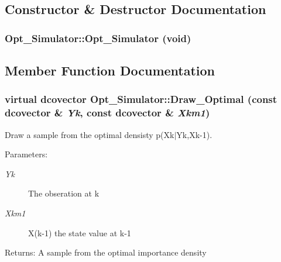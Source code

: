 \subsection{Constructor \& Destructor Documentation}
\hypertarget{class_opt___simulator_9c18baf105bd365af92a933e1a068c3e}{
\subsubsection[{Opt\_\-Simulator}]{\setlength{\rightskip}{0pt plus 5cm}Opt\_\-Simulator::Opt\_\-Simulator (void)}}
\label{class_opt___simulator_9c18baf105bd365af92a933e1a068c3e}




\subsection{Member Function Documentation}
\hypertarget{class_opt___simulator_75490247df4dfa14eb7b2d8d394675dd}{
\subsubsection[{Draw\_\-Optimal}]{\setlength{\rightskip}{0pt plus 5cm}virtual dcovector Opt\_\-Simulator::Draw\_\-Optimal (const dcovector \& {\em Yk}, \/  const dcovector \& {\em Xkm1})}}
\label{class_opt___simulator_75490247df4dfa14eb7b2d8d394675dd}


Draw a sample from the optimal densisty p(Xk$|$Yk,Xk-1). 

\begin{Desc}
\item[Parameters:]
\begin{description}
\item[{\em Yk}]The obseration at k \item[{\em Xkm1}]X(k-1) the state value at k-1\end{description}
\end{Desc}
\begin{Desc}
\item[Returns:]A sample from the optimal importance density \end{Desc}


